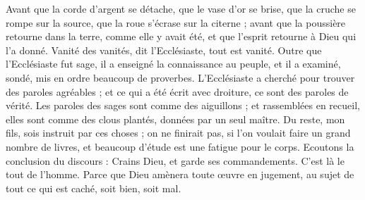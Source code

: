 \begin{multicols}{2}
Avant que la corde d'argent se détache, que le vase d'or se brise, que la cruche se rompe sur la source, que la roue s’écrase sur la citerne ;
avant que la poussière retourne dans la terre, comme elle y avait été, et que l'esprit retourne à Dieu qui l'a donné.
Vanité des vanités, dit l'Ecclésiaste, tout est vanité.
Outre que l'Ecclésiaste fut sage, il a enseigné la connaissance au peuple, et il a examiné, sondé, mis en ordre beaucoup de proverbes.
L'Ecclésiaste a cherché pour trouver des paroles agréables ; et ce qui a été écrit avec droiture, ce sont des paroles de vérité.
Les paroles des sages sont comme des aiguillons ; et rassemblées en recueil, elles sont comme des clous plantés, données par un seul maître.
Du reste, mon fils, sois instruit par ces choses ; on ne finirait pas, si l’on voulait faire un grand nombre de livres, et beaucoup d'étude est une fatigue pour le corps.
Ecoutons la conclusion du discours : Crains Dieu, et garde ses commandements. C'est là le tout de l'homme.
Parce que Dieu amènera toute œuvre en jugement, au sujet de tout ce qui est caché, soit bien, soit mal.
\PPE{}
\end{multicols}
